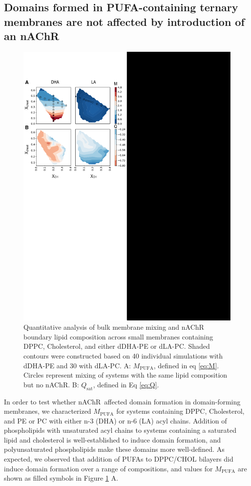 \documentclass[final,3p,times,twocolumn]{elsarticle}
\newcommand{\qsat}{Q_{\mathrm{sat}}}
\newcommand{\mself}[1]{M_{\mathrm{#1}}}
\newcommand{\nachr}{nAChR}
\begin{document}
\subsection {Domains formed in PUFA-containing ternary membranes are not affected by introduction of an \nachr } \label{Demix}
	\begin{figure}[h!]
		\center
		\includegraphics[width=1\linewidth]{Fig2.pdf}
		\caption{Quantitative analysis of bulk membrane mixing and nAChR boundary lipid composition across small membranes containing DPPC, Cholesterol, and either dDHA-PE or dLA-PC. Shaded contours were constructed based on 40 individual simulations with dDHA-PE and 30 with dLA-PC. A: $\mself{PUFA}$, defined in eq \ref{eq:M}.  Circles represent mixing of systems with the same lipid composition but no \nachr. B: $\qsat$, defined in Eq \ref{eq:Q}.   }
		\label{fig:fig2}
	\end{figure} 
	
	In order to test whether \nachr~affected domain formation in domain-forming membranes, we characterized $\mself{PUFA}$ for systems containing DPPC, Cholesterol, and PE or PC with either n-3 (DHA) or n-6 (LA) acyl chains.   Addition of phospholipids with unsaturated acyl chains to systems containing a saturated lipid and cholesterol is well-established to induce domain formation, and polyunsaturated phospholipids make these domains more well-defined\cite{Levental_Polyunsaturated_2016}. As expected, we observed that addition of PUFAs to DPPC/CHOL bilayers did induce domain formation over a range of compositions, and values for $\mself{PUFA}$ are shown as filled symbols in Figure \ref{fig:fig2} A. 
	
\end{document}
